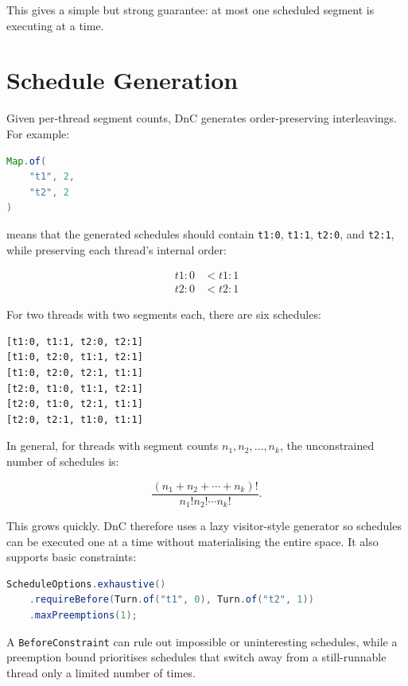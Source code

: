 \documentclass[11pt]{article}
\begin{document}
This gives a simple but strong guarantee: at most one scheduled segment is executing at a time.

\section{Schedule Generation}

Given per-thread segment counts, DnC generates order-preserving interleavings. For example:

\begin{lstlisting}[language=Java,caption={High-level schedule specification}]
Map.of(
    "t1", 2,
    "t2", 2
)
\end{lstlisting}

means that the generated schedules should contain \texttt{t1:0}, \texttt{t1:1}, \texttt{t2:0}, and \texttt{t2:1}, while preserving each thread's internal order:

\begin{align*}
  t1:0 &< t1:1 \\
  t2:0 &< t2:1
\end{align*}

For two threads with two segments each, there are six schedules:

\begin{lstlisting}[caption={All two-by-two interleavings}]
[t1:0, t1:1, t2:0, t2:1]
[t1:0, t2:0, t1:1, t2:1]
[t1:0, t2:0, t2:1, t1:1]
[t2:0, t1:0, t1:1, t2:1]
[t2:0, t1:0, t2:1, t1:1]
[t2:0, t2:1, t1:0, t1:1]
\end{lstlisting}

In general, for threads with segment counts \(n_1, n_2, \ldots, n_k\), the unconstrained number of schedules is:

\[
  \frac{(n_1 + n_2 + \cdots + n_k)!}{n_1!n_2!\cdots n_k!}.
\]

This grows quickly. DnC therefore uses a lazy visitor-style generator so schedules can be executed one at a time without materialising the entire space. It also supports basic constraints:

\begin{lstlisting}[language=Java,caption={Constrained schedule generation}]
ScheduleOptions.exhaustive()
    .requireBefore(Turn.of("t1", 0), Turn.of("t2", 1))
    .maxPreemptions(1);
\end{lstlisting}

A \texttt{BeforeConstraint} can rule out impossible or uninteresting schedules, while a preemption bound prioritises schedules that switch away from a still-runnable thread only a limited number of times.
\end{document}
